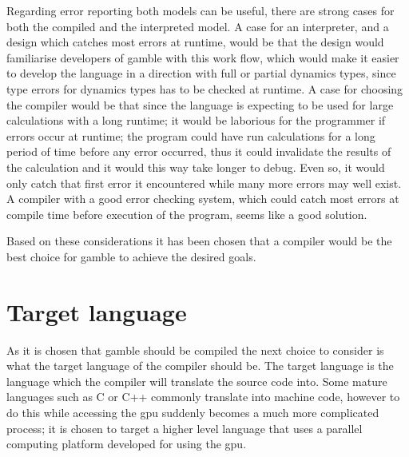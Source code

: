 Regarding error reporting both models can be useful, there are strong cases for both the compiled and the interpreted model.
A case for an interpreter, and a design which catches most errors at runtime, would be that the design would familiarise developers of \gls{gamble} with this work flow, which would make it easier to develop the language in a direction with full or partial dynamics types, since type errors for dynamics types has to be checked at runtime. 
A case for choosing the compiler would be that since the language is expecting to be used for large calculations with a long runtime; it would be laborious for the programmer if errors occur at runtime; the program could have run calculations for a long period of time before any error occurred, thus it could invalidate the results of the calculation and it would this way take longer to debug.
Even so, it would only catch that first error it encountered while many more errors may well exist.
A compiler with a good error checking system, which could catch most errors at compile time before execution of the program, seems like a good solution. \citep{Sebesta, Crafting_book} 

Based on these considerations it has been chosen that a compiler would be the best choice for \gls{gamble} to achieve the desired goals.

\section{Target language}\label{CUDAvsOpenCL}
As it is chosen that \gls{gamble} should be compiled the next choice to consider is what the target language of the compiler should be.
The target language is the language which the compiler will translate the source code into.
Some mature languages such as C or C++ commonly translate into machine code, however to do this while accessing the \acrshort{gpu} suddenly becomes a much more complicated process; it is chosen to target a higher level language that uses a parallel computing platform developed for using the \acrshort{gpu}.

